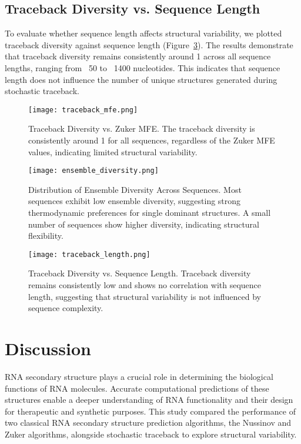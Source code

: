 \documentclass[10pt]{wlscirep}
\begin{document}
\subsection{Traceback Diversity vs. Sequence Length}
To evaluate whether sequence length affects structural variability, we plotted traceback diversity against sequence length (Figure~\ref{fig:traceback_length}). The results demonstrate that traceback diversity remains consistently around 1 across all sequence lengths, ranging from ~50 to ~1400 nucleotides. This indicates that sequence length does not influence the number of unique structures generated during stochastic traceback.

\begin{figure}[h!]
    \centering
    \texttt{[image: traceback\_mfe.png]}
    \caption{Traceback Diversity vs. Zuker MFE. The traceback diversity is consistently around 1 for all sequences, regardless of the Zuker MFE values, indicating limited structural variability.}
    \label{fig:traceback_mfe}
\end{figure}

\begin{figure}[h!]
    \centering
    \texttt{[image: ensemble\_diversity.png]}
    \caption{Distribution of Ensemble Diversity Across Sequences. Most sequences exhibit low ensemble diversity, suggesting strong thermodynamic preferences for single dominant structures. A small number of sequences show higher diversity, indicating structural flexibility.}
    \label{fig:ensemble_diversity}
\end{figure}

\begin{figure}[h!]
    \centering
    \texttt{[image: traceback\_length.png]}
    \caption{Traceback Diversity vs. Sequence Length. Traceback diversity remains consistently low and shows no correlation with sequence length, suggesting that structural variability is not influenced by sequence complexity.}
    \label{fig:traceback_length}
\end{figure}

\section{Discussion}

RNA secondary structure plays a crucial role in determining the biological functions of RNA molecules. Accurate computational predictions of these structures enable a deeper understanding of RNA functionality and their design for therapeutic and synthetic purposes. This study compared the performance of two classical RNA secondary structure prediction algorithms, the Nussinov and Zuker algorithms, alongside stochastic traceback to explore structural variability.
\end{document}
